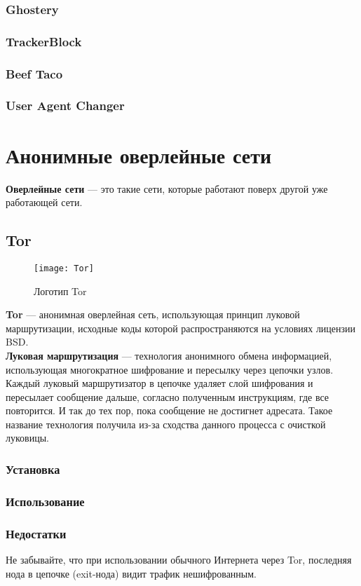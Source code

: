 \subsubsection{Ghostery}
\subsubsection{TrackerBlock}
\subsubsection{Beef Taco}
\subsubsection{User Agent Changer}

\section{Анонимные оверлейные сети}
\textbf{Оверлейные сети} --- это такие сети, которые работают поверх другой уже работающей сети.
\subsection{Tor}
\begin{wrapfigure}[8]{r}{0.25\linewidth}
\texttt{[image: Tor]}
\caption{Логотип Tor}
\end{wrapfigure}
\textbf{Tor} --- анонимная оверлейная сеть, использующая принцип луковой маршрутизации, исходные коды которой распространяются на условиях лицензии BSD\cite{tor_license}.\\
\textbf{Луковая маршрутизация} --- технология анонимного обмена информацией, использующая многократное шифрование и пересылку через цепочки узлов. Каждый луковый маршрутизатор в цепочке удаляет слой шифрования и пересылает сообщение дальше, согласно полученным инструкциям, где все повторится. И так до тех пор, пока сообщение не достигнет адресата. Такое название технология получила из-за сходства данного процесса с очисткой луковицы.\\
\subsubsection{Установка}
\subsubsection{Использование}
\subsubsection{Недостатки}
\begin{important}
Не забывайте, что при использовании обычного Интернета через Tor, последняя нода в цепочке (exit-нода) видит трафик нешифрованным.
\end{important}
